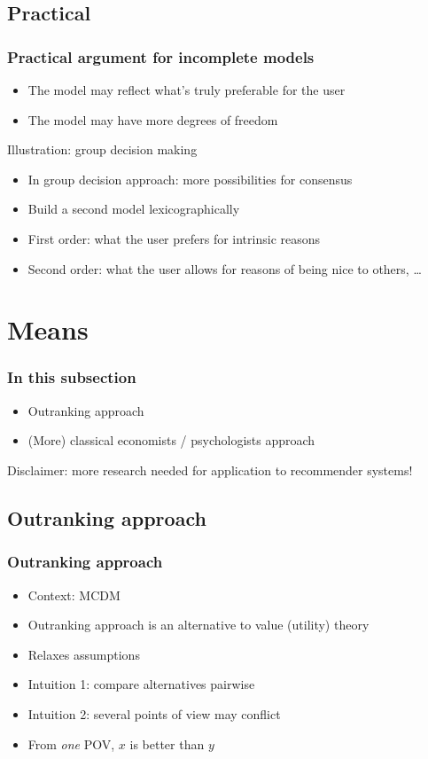 \documentclass[french,english]{beamer}
\begin{document}
\subsection{Practical}
\begin{frame}
	\frametitle{Practical argument for incomplete models}
	\begin{itemize}
		\item The model may reflect what’s truly preferable for the user
		\item The model may have more degrees of freedom
	\end{itemize}
	\begin{block}{Illustration: group decision making}
		\begin{itemize}
			\item In group decision approach: more possibilities for consensus
			\item Build a second model lexicographically
			\item First order: what the user prefers for intrinsic reasons
			\item Second order: what the user allows for reasons of being nice to others, …
		\end{itemize}
	\end{block}
\end{frame}

\section{Means}
\begin{frame}
	\frametitle{In this subsection}
	\begin{itemize}
		\item Outranking approach
		\item (More) classical economists / psychologists approach
	\end{itemize}
	Disclaimer: more research needed for application to recommender systems!
\end{frame}

\subsection{Outranking approach}
\begin{frame}
	\frametitle{Outranking approach}
	\begin{itemize}
		\item Context: MCDM
		\item Outranking approach is an alternative to value (utility) theory
		\item Relaxes assumptions
		\item Intuition 1: compare alternatives pairwise
		\item Intuition 2: several points of view may conflict
		\item From \emph{one} POV, $x$ is better than $y$
	\end{itemize}
\end{frame}
\end{document}
